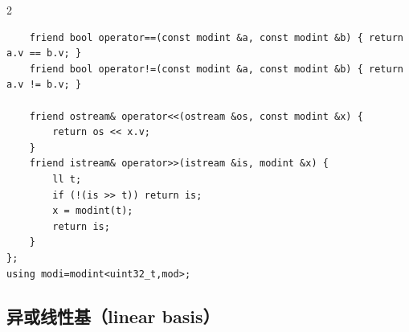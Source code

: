 \begin{multicols*}{2}
\begin{verbatim}
	friend bool operator==(const modint &a, const modint &b) { return a.v == b.v; }
	friend bool operator!=(const modint &a, const modint &b) { return a.v != b.v; }

	friend ostream& operator<<(ostream &os, const modint &x) {
		return os << x.v;
	}
	friend istream& operator>>(istream &is, modint &x) {
		ll t;
		if (!(is >> t)) return is;
		x = modint(t);
		return is;
	}
};
using modi=modint<uint32_t,mod>;
		\end{verbatim}








		\subsection{异或线性基（linear basis）}


\end{multicols*}

